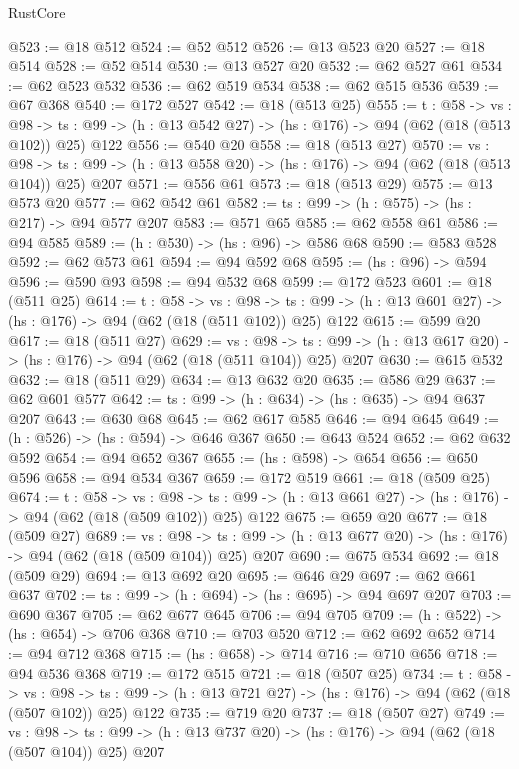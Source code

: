 \begin{lexlean}{RustCore}
\begin{coremodule}
@523 := @18 @512
@524 := @52 @512
@526 := @13 @523 @20
@527 := @18 @514
@528 := @52 @514
@530 := @13 @527 @20
@532 := @62 @527 @61
@534 := @62 @523 @532
@536 := @62 @519 @534
@538 := @62 @515 @536
@539 := @67 @368
@540 := @172 @527
@542 := @18 (@513 @25)
@555 := {t : @58} ->
  {vs : @98} ->
  {ts : @99} -> (h : @13 @542 @27) -> (hs : @176) -> @94 (@62 (@18 (@513 @102)) @25) @122
@556 := @540 @20
@558 := @18 (@513 @27)
@570 := {vs : @98} ->
  {ts : @99} -> (h : @13 @558 @20) -> (hs : @176) -> @94 (@62 (@18 (@513 @104)) @25) @207
@571 := @556 @61
@573 := @18 (@513 @29)
@575 := @13 @573 @20
@577 := @62 @542 @61
@582 := {ts : @99} -> (h : @575) -> (hs : @217) -> @94 @577 @207
@583 := @571 @65
@585 := @62 @558 @61
@586 := @94 @585
@589 := (h : @530) -> (hs : @96) -> @586 @68
@590 := @583 @528
@592 := @62 @573 @61
@594 := @94 @592 @68
@595 := (hs : @96) -> @594
@596 := @590 @93
@598 := @94 @532 @68
@599 := @172 @523
@601 := @18 (@511 @25)
@614 := {t : @58} ->
  {vs : @98} ->
  {ts : @99} -> (h : @13 @601 @27) -> (hs : @176) -> @94 (@62 (@18 (@511 @102)) @25) @122
@615 := @599 @20
@617 := @18 (@511 @27)
@629 := {vs : @98} ->
  {ts : @99} -> (h : @13 @617 @20) -> (hs : @176) -> @94 (@62 (@18 (@511 @104)) @25) @207
@630 := @615 @532
@632 := @18 (@511 @29)
@634 := @13 @632 @20
@635 := @586 @29
@637 := @62 @601 @577
@642 := {ts : @99} -> (h : @634) -> (hs : @635) -> @94 @637 @207
@643 := @630 @68
@645 := @62 @617 @585
@646 := @94 @645
@649 := (h : @526) -> (hs : @594) -> @646 @367
@650 := @643 @524
@652 := @62 @632 @592
@654 := @94 @652 @367
@655 := (hs : @598) -> @654
@656 := @650 @596
@658 := @94 @534 @367
@659 := @172 @519
@661 := @18 (@509 @25)
@674 := {t : @58} ->
  {vs : @98} ->
  {ts : @99} -> (h : @13 @661 @27) -> (hs : @176) -> @94 (@62 (@18 (@509 @102)) @25) @122
@675 := @659 @20
@677 := @18 (@509 @27)
@689 := {vs : @98} ->
  {ts : @99} -> (h : @13 @677 @20) -> (hs : @176) -> @94 (@62 (@18 (@509 @104)) @25) @207
@690 := @675 @534
@692 := @18 (@509 @29)
@694 := @13 @692 @20
@695 := @646 @29
@697 := @62 @661 @637
@702 := {ts : @99} -> (h : @694) -> (hs : @695) -> @94 @697 @207
@703 := @690 @367
@705 := @62 @677 @645
@706 := @94 @705
@709 := (h : @522) -> (hs : @654) -> @706 @368
@710 := @703 @520
@712 := @62 @692 @652
@714 := @94 @712 @368
@715 := (hs : @658) -> @714
@716 := @710 @656
@718 := @94 @536 @368
@719 := @172 @515
@721 := @18 (@507 @25)
@734 := {t : @58} ->
  {vs : @98} ->
  {ts : @99} -> (h : @13 @721 @27) -> (hs : @176) -> @94 (@62 (@18 (@507 @102)) @25) @122
@735 := @719 @20
@737 := @18 (@507 @27)
@749 := {vs : @98} ->
  {ts : @99} -> (h : @13 @737 @20) -> (hs : @176) -> @94 (@62 (@18 (@507 @104)) @25) @207

\end{coremodule}
\end{lexlean}
